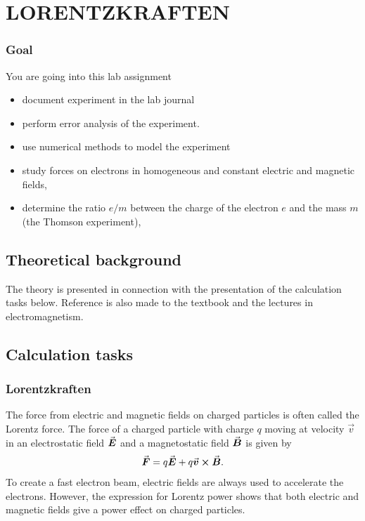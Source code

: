\documentclass[../Elmag-labhefte-2020.tex]{subfiles}
\begin{document}
\chapter{LORENTZKRAFTEN \label{ch.lorentz}}

\subsection*{Goal}

You are going into this lab assignment
%
\begin{itemize}
    \item document experiment in the lab journal
    \item perform error analysis of the experiment.
    \item use numerical methods to model the experiment
    \item study forces on electrons in homogeneous and constant electric and magnetic fields,
    \item determine the ratio $e/m$ between the charge of the electron $e$ and the mass $m$ (the Thomson experiment),
\end{itemize}
%

\section{Theoretical background}

The theory is presented in connection with the presentation of the calculation tasks below. Reference is also made to the textbook and the lectures in electromagnetism.

\section{Calculation tasks \label{ch.lorentz.beregn}}

\subsection{Lorentzkraften}

The force from electric and magnetic fields on charged particles is often called the Lorentz force. The force of a charged particle with charge $q$ moving at velocity $\vec{v}$ in an electrostatic field $\va*{E}$ and a magnetostatic field $\va*{B}$ is given by
\begin{equation}
    \va*{F} = q \va*{E} + q \va*{v} \cross \va*{B} .
    \label{eq:lorentz.lorentz} %
\end{equation}
%
To create a fast electron beam, electric fields are always used to accelerate the electrons. However, the expression for Lorentz power shows that both electric and magnetic fields give a power effect on charged particles.
\end{document}
